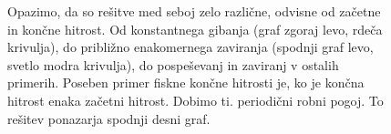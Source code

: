 \documentclass[slovene,11pt,a4paper]{article}
\numberwithin{equation}{section} %
\numberwithin{figure}{section} %
\numberwithin{table}{section} %
\begin{document}
\begin{figure}[h]
{\begin{minipage}[t]{0.5\paperwidth}
\end{minipage}%
}
\noindent{}
\caption{Opazimo, da so rešitve med seboj zelo različne, odvisne od začetne in končne hitrost. Od konstantnega gibanja (graf zgoraj levo, rdeča krivulja), do približno enakomernega zaviranja (spodnji graf levo, svetlo modra krivulja), do pospeševanj in zaviranj v ostalih primerih. Poseben primer fiskne končne hitrosti je, ko je končna hitrost enaka začetni hitrost. Dobimo ti. periodični robni pogoj. To rešitev ponazarja spodnji desni graf.}
\end{figure}
\end{document}

